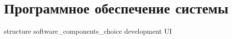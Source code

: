 \section{Программное обеспечение системы}
\label{sec:software}

{structure}
{software_components_choice}
{development}
{UI}

\newpage
